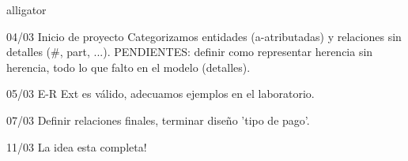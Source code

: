 \documentclass[10pt]{article}
\begin{document}
	\begin{labeling}{alligator}
		\item [04/03] Inicio de proyecto Categorizamos entidades (a-atributadas) y relaciones sin detalles ($\#$, part, ...). PENDIENTES: definir como representar herencia sin herencia, todo lo que falto en el modelo (detalles).
		\item [05/03] E-R Ext es válido, adecuamos ejemplos en el laboratorio. 
		\item [07/03] Definir relaciones finales, terminar diseño 'tipo de pago'.
		\item [11/03] La idea esta completa!
	\end{labeling}
	
	
	
\end{document}
